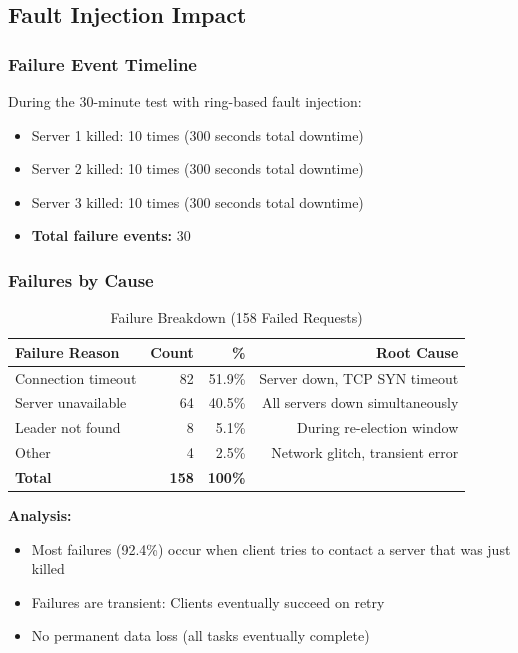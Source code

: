 \documentclass[12pt,a4paper]{article}
\begin{document}
\subsection{Fault Injection Impact}

\subsubsection{Failure Event Timeline}

During the 30-minute test with ring-based fault injection:
\begin{itemize}
    \item Server 1 killed: 10 times (300 seconds total downtime)
    \item Server 2 killed: 10 times (300 seconds total downtime)
    \item Server 3 killed: 10 times (300 seconds total downtime)
    \item \textbf{Total failure events:} 30
\end{itemize}

\subsubsection{Failures by Cause}

\begin{table}[h]
\centering
\caption{Failure Breakdown (158 Failed Requests)}
\label{tab:failure-breakdown}
\begin{tabular}{@{}lrrr@{}}
\toprule
\textbf{Failure Reason} & \textbf{Count} & \textbf{\%} & \textbf{Root Cause} \\
\midrule
Connection timeout & 82 & 51.9\% & Server down, TCP SYN timeout \\
Server unavailable & 64 & 40.5\% & All servers down simultaneously \\
Leader not found & 8 & 5.1\% & During re-election window \\
Other & 4 & 2.5\% & Network glitch, transient error \\
\midrule
\textbf{Total} & \textbf{158} & \textbf{100\%} & \\
\bottomrule
\end{tabular}
\end{table}

\textbf{Analysis:}
\begin{itemize}
    \item Most failures (92.4\%) occur when client tries to contact a server that was just killed
    \item Failures are transient: Clients eventually succeed on retry
    \item No permanent data loss (all tasks eventually complete)
\end{itemize}
\end{document}
